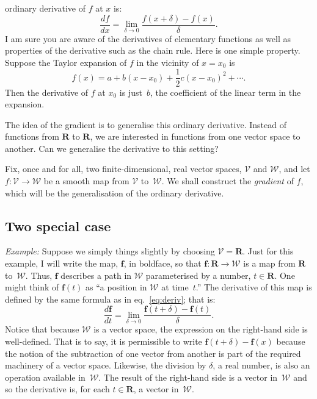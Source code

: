 \documentclass{article}
\newcommand{\set}[1]{\mathbf{#1}}
\newcommand{\R}{\set{R}}
\newcommand{\V}{\mathcal{V}}
\newcommand{\W}{\mathcal{W}}
\newcommand{\vv}[1]{\symbf{#1}}
\begin{document}
ordinary derivative of $f$ at $x$ is:
\begin{equation}\label{eq:deriv}
  \frac{df}{dx} = \lim_{\delta\to0}\frac{f(x + \delta)-f(x)}{\delta}.
\end{equation}
I am sure you are aware of the derivatives of elementary functions
as well as properties of the derivative such as the chain rule.  Here
is one simple property. Suppose the Taylor expansion of $f$ in the
vicinity of $x=x_0$ is
\begin{equation*}
  f(x) = a + b (x-x_0) + \frac{1}{2}c(x-x_0)^2 + \dotsb. 
\end{equation*}
Then the derivative of $f$ at $x_0$ is just~$b$, the coefficient of
the linear term in the expansion.

The idea of the gradient is to generalise this ordinary derivative.
Instead of functions from $\R$ to $\R$, we are interested in functions
from one vector space to another.  Can we generalise the derivative to this
setting?

Fix, once and for all, two finite-dimensional, real vector spaces,
$\mathcal{V}$ and $\mathcal{W}$, and let
$f\colon \mathcal{V}\to\mathcal{W}$ be a smooth map from $\mathcal{V}$
to~$\mathcal{W}$.  We shall construct the
\emph{gradient} of $f$, which will be the generalisation of the
ordinary derivative.

\subsection{Two special case}

\emph{Example:} Suppose we simply things slightly by choosing
$\V=\set{R}$. Just for this example, I will write the map, $\vv{f}$,
in boldface, so that $\vv{f}\colon\R\to\W$ is a map from $\R$
to~$\W$. Thus, $\vv{f}$ describes a path in
$\W$ parameterised by a number, $t\in \R$.  One might think of
$\vv{f}(t)$ as ``a position in $\W$ at time~$t$.''  The derivative of
this map is defined by the same formula as in eq.~\eqref{eq:deriv}; that
is:
\begin{equation*}
  \frac{d\vv{f}}{dt} = \lim_{\delta\to0}\frac{\vv{f}(t + \delta)-\vv{f}(t)}{\delta}.
\end{equation*}
Notice that because $\mathcal{W}$ is a vector space, the expression on the
right-hand side is well-defined. That is to say, it is permissible to
write $\vv{f}(t + \delta)-\vv{f}(x)$ because the notion of the subtraction
of one vector from another is part of the required machinery of a
vector space.  Likewise, the division by $\delta$, a real number, is also
an operation available in~$\W$. The result of the right-hand side is a
vector in~$\W$ and so the derivative is, for each $t\in\R$, a vector
in~$\W$.
\end{document}
